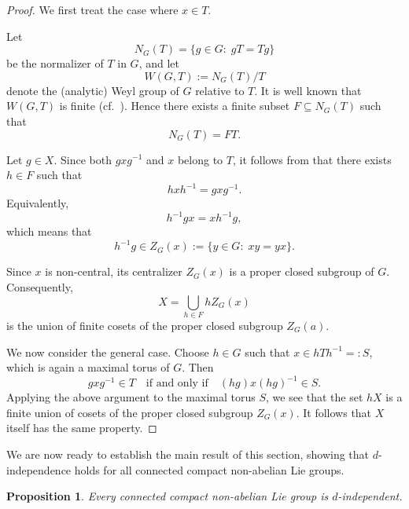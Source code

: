 \documentclass[12pt]{amsart}
\newtheorem{proposition}[theorem]{Proposition}
\theoremstyle{definition}
\theoremstyle{remark}
\begin{document}
\begin{proof}
	We first treat the case where $x\in T$.
	
	Let
	\[
	N_G(T)=\{g\in G:\; gT=Tg\}
	\]
	be the normalizer of $T$ in $G$, and let
	\[
	W(G,T):=N_G(T)/T
	\]
	denote the (analytic) Weyl group of $G$ relative to $T$.
	It is well known that $W(G,T)$ is finite
	(cf.\ \cite[Theorem~6.36(e)]{Sep}).
	Hence there exists a finite subset $F\subseteq N_G(T)$ such that
	\[
	N_G(T)=FT.
	\]
	
	Let $g\in X$.
	Since both $gxg^{-1}$ and $x$ belong to $T$, it follows from
	\cite[Theorem~6.36(f)]{Sep} that there exists $h\in F$ such that
	\[
	hxh^{-1}=gxg^{-1}.
	\]
	Equivalently,
	\[
	h^{-1}gx=xh^{-1}g,
	\]
	which means that
	\[
	h^{-1}g\in Z_G(x):=\{y\in G:\; xy=yx\}.
	\]
	
	Since $x$ is non-central, its centralizer $Z_G(x)$ is a proper closed
	subgroup of $G$.
	Consequently,
	\[
	X=\bigcup_{h\in F} hZ_G(x)
	\]
    is the union of finite cosets of the proper closed subgroup $Z_G(a)$.	
	
	We now consider the general case.
	Choose $h\in G$ such that $x\in hTh^{-1}=:S$, which is again a maximal torus of $G$.
	Then
	\[
	gxg^{-1}\in T \quad\text{if and only if}\quad (hg)x(hg)^{-1}\in S.
	\]
	Applying the above argument to the maximal torus $S$, we see that the set $hX$
	is a finite union of cosets of the proper closed subgroup $Z_G(x)$.
	It follows that $X$ itself has the same property.
\end{proof}


We are now ready to establish the main result of this section, showing that
$d$-independence holds for all connected compact non-abelian Lie groups.

\begin{proposition}\label{noch}
	Every connected compact non-abelian Lie group is $d$-independent.
\end{proposition}
\end{document}
